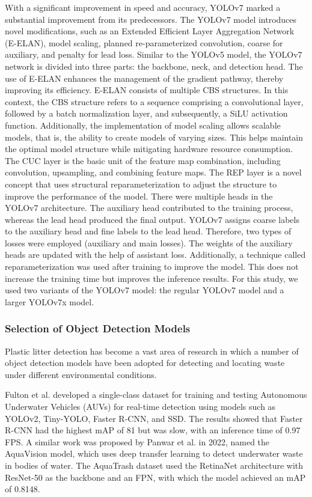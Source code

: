 \documentclass{ieeeaccess}
\begin{document}
With a significant improvement in speed and accuracy, YOLOv7 marked a substantial improvement from its predecessors. The YOLOv7 model introduces novel modifications, such as an Extended Efficient Layer Aggregation Network (E-ELAN), model scaling, planned re-parameterized convolution, coarse for auxiliary, and penalty for lead loss. Similar to the YOLOv5 model, the YOLOv7 network is divided into three parts: the backbone, neck, and detection head. The use of E-ELAN enhances the management of the gradient pathway, thereby improving its efficiency. E-ELAN consists of multiple CBS structures. In this context, the CBS structure refers to a sequence comprising a convolutional layer, followed by a batch normalization layer, and subsequently, a SiLU activation function. Additionally, the implementation of model scaling allows scalable models, that is, the ability to create models of varying sizes. This helps maintain the optimal model structure while mitigating hardware resource consumption. The CUC layer is the basic unit of the feature map combination, including convolution, upsampling, and combining feature maps. The REP layer is a novel concept that uses structural reparameterization to adjust the structure to improve the performance of the model. There were multiple heads in the YOLOv7 architecture. The auxiliary head contributed to the training process, whereas the lead head produced the final output. YOLOv7 assigns coarse labels to the auxiliary head and fine labels to the lead head. Therefore, two types of losses were employed (auxiliary and main losses). The weights of the auxiliary heads are updated with the help of assistant loss. Additionally, a technique called reparameterization was used after training to improve the model. This does not increase the training time but improves the inference results. For this study, we used two variants of the YOLOv7 model: the regular YOLOv7 model and a larger YOLOv7x model.

\vspace{0.3cm}
\subsubsection{Selection of Object Detection Models}
\label{sec:OD_selection}
Plastic litter detection has become a vast area of research in which a number of object detection models have been adopted for detecting and locating waste under different environmental conditions.

Fulton et al. \cite{Fulton2018RoboticDO} developed a single-class dataset for training and testing Autonomous Underwater Vehicles (AUVs) for real-time detection using models such as YOLOv2, Tiny-YOLO, Faster R-CNN, and SSD. The results showed that Faster R-CNN had the highest mAP of 81 but was slow, with an inference time of 0.97 FPS. A similar work was proposed by Panwar et al. \cite{Panwar2020AquaVisionAT} in 2022, named the AquaVision model, which uses deep transfer learning to detect underwater waste in bodies of water. The AquaTrash dataset used the RetinaNet architecture with ResNet-50 as the backbone and an FPN, with which the model achieved an mAP of 0.8148.
\end{document}
